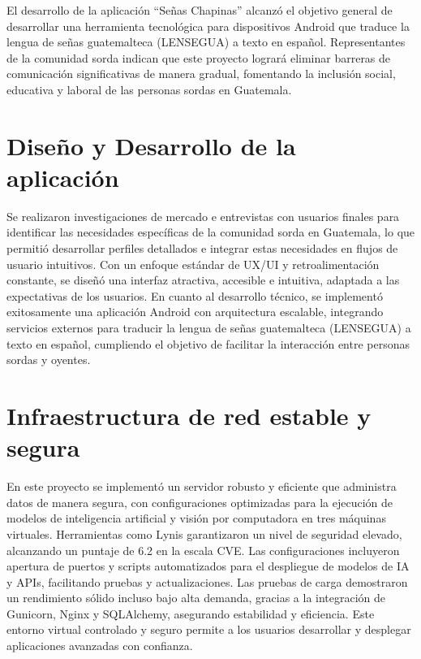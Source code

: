 El desarrollo de la aplicación ``Señas Chapinas''  alcanzó el objetivo general de desarrollar una herramienta tecnológica para dispositivos Android que traduce la lengua de señas guatemalteca (LENSEGUA) a texto en español. Representantes de la comunidad sorda indican que este proyecto logrará eliminar barreras de comunicación significativas de manera gradual, fomentando la inclusión social, educativa y laboral de las personas sordas en Guatemala.

    \section{Diseño y Desarrollo de la aplicación} 
    Se realizaron investigaciones de mercado e entrevistas con usuarios finales para identificar las necesidades específicas de la comunidad sorda en Guatemala, lo que permitió desarrollar perfiles detallados e integrar estas necesidades en flujos de usuario intuitivos. Con un enfoque estándar de UX/UI y retroalimentación constante, se diseñó una interfaz atractiva, accesible e intuitiva, adaptada a las expectativas de los usuarios. En cuanto al desarrollo técnico, se implementó exitosamente una aplicación Android con arquitectura escalable, integrando servicios externos para traducir la lengua de señas guatemalteca (LENSEGUA) a texto en español, cumpliendo el objetivo de facilitar la interacción entre personas sordas y oyentes.



    \section{Infraestructura de red estable y segura} 
    En este proyecto se implementó un servidor robusto y eficiente que administra datos de manera segura, con configuraciones optimizadas para la ejecución de modelos de inteligencia artificial y visión por computadora en tres máquinas virtuales. Herramientas como Lynis garantizaron un nivel de seguridad elevado, alcanzando un puntaje de 6.2 en la escala CVE. Las configuraciones incluyeron apertura de puertos y scripts automatizados para el despliegue de modelos de IA y APIs, facilitando pruebas y actualizaciones. Las pruebas de carga demostraron un rendimiento sólido incluso bajo alta demanda, gracias a la integración de Gunicorn, Nginx y SQLAlchemy, asegurando estabilidad y eficiencia. Este entorno virtual controlado y seguro permite a los usuarios desarrollar y desplegar aplicaciones avanzadas con confianza.


    
    
    
    
    
    
    
    
    
    
        
